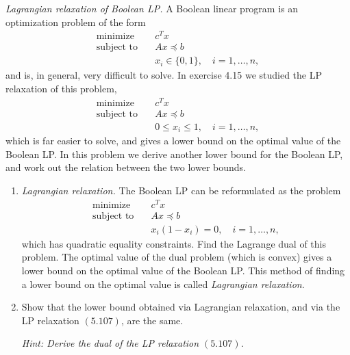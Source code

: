 \documentclass[11pt,letter,notitlepage]{article}
\theoremstyle{definition}
\begin{document}
\begin{exercise}
\textit{Lagrangian relaxation of Boolean LP.} A Boolean linear program is an optimization problem of the form
\[
\begin{aligned}
    \text{minimize} \quad & c^T x \\
    \text{subject to} \quad & Ax \preceq b \\
    & x_i \in \{0,1\}, \quad i=1,\dots,n,
\end{aligned}
\]
and is, in general, very difficult to solve. In exercise 4.15 we studied the LP relaxation of this problem,
\[
\begin{aligned}
    \text{minimize} \quad & c^T x \\
    \text{subject to} \quad & Ax \preceq b \\
    & 0 \le x_i \le 1, \quad i=1,\dots,n,
\end{aligned}
\tag{5.107}
\]
which is far easier to solve, and gives a lower bound on the optimal value of the Boolean LP. In this problem we derive another lower bound for the Boolean LP, and work out the relation between the two lower bounds.

\begin{enumerate}
    \item[(a)] \textit{Lagrangian relaxation.}
    The Boolean LP can be reformulated as the problem
    \[
    \begin{aligned}
        \text{minimize} \quad & c^T x \\
        \text{subject to} \quad & Ax \preceq b \\
        & x_i(1-x_i)=0, \quad i=1,\dots,n,
    \end{aligned}
    \]
    which has quadratic equality constraints. Find the Lagrange dual of this problem.
    The optimal value of the dual problem (which is convex) gives a lower bound on
    the optimal value of the Boolean LP. This method of finding a lower bound on the
    optimal value is called \textit{Lagrangian relaxation}.

    \item[(b)] Show that the lower bound obtained via Lagrangian relaxation, and via
    the LP relaxation \((5.107)\), are the same.

    \textit{Hint: Derive the dual of the LP relaxation \((5.107)\).}
\end{enumerate}
\end{exercise}

\newpage
\end{document}

